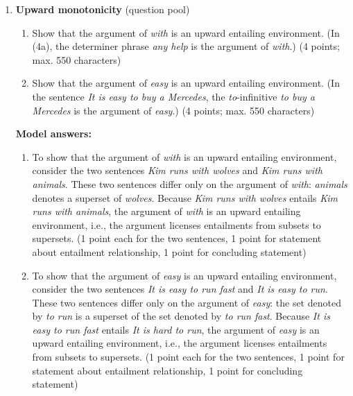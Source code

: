 \documentclass[a4,11pt]{article}
\begin{document}
\begin{enumerate}[leftmargin = 12pt]
\item {\bf Upward monotonicity} (question pool)

\begin{enumerate}[noitemsep]

\item Show that the argument of \textit{with} is an upward entailing environment. (In (4a), the determiner phrase \textit{any help} is the argument of \textit{with}.) (4 points; max. 550 characters)

\item Show that the argument of \textit{easy} is an upward entailing environment. (In the sentence \textit{It is easy to buy a Mercedes}, the \textit{to}-infinitive \textit{to buy a Mercedes} is the argument of \textit{easy}.) (4 points; max. 550 characters)

\end{enumerate}

{\bf Model answers:} 

\begin{enumerate}[noitemsep]

\item To show that the argument of \textit{with} is an upward entailing environment, consider the two sentences \textit{Kim runs with wolves} and \textit{Kim runs with animals}. These two sentences differ only on the argument of {\em with}: {\em animals} denotes a superset of {\em wolves}. Because \textit{Kim runs with wolves} entails \textit{Kim runs with animals}, the argument of \textit{with} is an upward entailing environment, i.e., the argument licenses entailments from subsets to supersets. (1 point each for the two sentences, 1 point for statement about entailment relationship, 1 point for concluding statement)

\item To show that the argument of \textit{easy} is an upward entailing environment, consider the two sentences {\em It is easy to run fast} and {\em It is easy to run}. These two sentences differ only on the argument of {\em easy}: the set denoted by {\em to run} is a superset of the set denoted by {\em to run fast}. Because {\em It is easy to run fast} entails {\em It is hard to run}, the argument of {\em easy} is an upward entailing environment, i.e., the argument licenses entailments from subsets to supersets. (1 point each for the two sentences, 1 point for statement about entailment relationship, 1 point for concluding statement)

\end{enumerate}


\end{enumerate}
\end{document}
